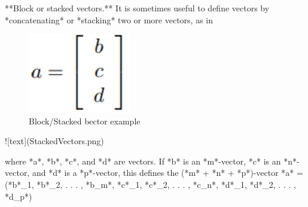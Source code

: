 \documentclass{article}
\begin{document}
\newline 

\newline 
**Block or stacked vectors.** It is sometimes useful to define vectors by *concatenating* or *stacking* two or more vectors, as in

\begin{figure}[H]
    \centering
    \includegraphics[width=0.4\textwidth]{imgs/SLIAL/StackedVectors.png}
    \caption{Block/Stacked bector example}
    \label{Block/Stacked bector example}
\end{figure}



![text](StackedVectors.png)

where *a*, *b*, *c*, and *d* are vectors. If *b* is an *m*-vector, *c* is an *n*-vector, and *d* is a
*p*-vector, this defines the (*m* + *n* + *p*)-vector
	*a* = (*b*_1, *b*_2, . . . , *b_m*, *c*_1, *c*_2, . . . , *c_n*, *d*_1, *d*_2, . . . , *d_p*)
\end{document}
